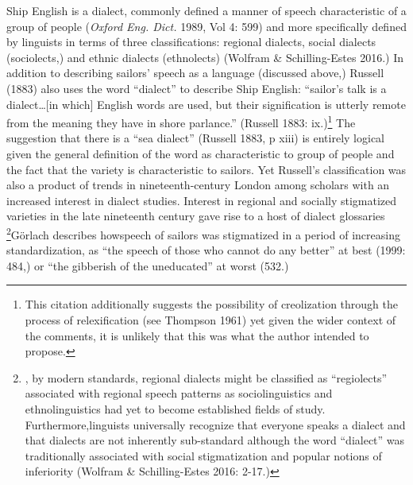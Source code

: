 \begin{styleStandard}
Ship English is a dialect, commonly defined a manner of speech characteristic of a group of people (\textit{Oxford Eng. Dict. }1989, Vol 4: 599) and more specifically defined by linguists in terms of three classifications: regional dialects, social dialects (sociolects,) and ethnic dialects (ethnolects) (Wolfram \& Schilling-Estes 2016.) In addition to describing sailors’ speech as a language (discussed above,) Russell (1883) also uses the word “dialect” to describe Ship English: “sailor’s talk is a dialect…[in which] English words are used, but their signification is utterly remote from the meaning they have in shore parlance.” (Russell 1883: ix.)\footnote{ This citation additionally suggests the possibility of creolization through the process of relexification (see Thompson 1961) yet given the wider context of the comments, it is unlikely that this was what the author intended to propose. } The suggestion that there is a “sea dialect” (Russell 1883, p xiii) is entirely logical given the general definition of the word as characteristic to group of people and the fact that the variety is characteristic to sailors. Yet Russell’s classification was also a product of trends in nineteenth-century London among scholars with an increased interest in dialect studies. Interest in regional and socially stigmatized varieties in the late nineteenth century gave rise to a host of dialect glossaries \footnote{ , by modern standards, regional dialects might be classified as “regiolects”  associated with regional speech patterns as sociolinguistics and ethnolinguistics had yet to become established fields of study. Furthermore,linguists universally recognize that everyone speaks a dialect and that dialects are not inherently sub-standard although the word “dialect” was traditionally associated with social stigmatization and popular notions of inferiority (Wolfram \& Schilling-Estes 2016: 2-17.) }\textstylereferencetext{ }Görlach describes howspeech of sailors was stigmatized in a period of increasing standardization, as “the speech of those who cannot do any better” at best (1999: 484,) or “the gibberish of the uneducated” at worst (532.)
\end{styleStandard}


